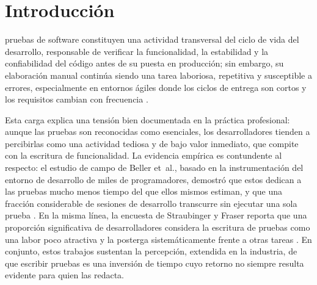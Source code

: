 \documentclass[10pt,journal,twoside,letterpaper]{IEEEtran}
\begin{document}
	\section{Introducción}
	\label{sec:introduccion}
	
	 pruebas de software constituyen una actividad transversal del ciclo de vida del desarrollo, responsable de verificar la funcionalidad, la estabilidad y la confiabilidad del código antes de su puesta en producción; sin embargo, su elaboración manual continúa siendo una tarea laboriosa, repetitiva y susceptible a errores, especialmente en entornos ágiles donde los ciclos de entrega son cortos y los requisitos cambian con frecuencia \cite{lukasczyk2023empirical,wang2024survey}.
	
	Esta carga explica una tensión bien documentada en la práctica profesional: aunque las pruebas son reconocidas como esenciales, los desarrolladores tienden a percibirlas como una actividad tediosa y de bajo valor inmediato, que compite con la escritura de funcionalidad. La evidencia empírica es contundente al respecto: el estudio de campo de Beller et~al., basado en la instrumentación del entorno de desarrollo de miles de programadores, demostró que estos dedican a las pruebas mucho menos tiempo del que ellos mismos estiman, y que una fracción considerable de sesiones de desarrollo transcurre sin ejecutar una sola prueba \cite{beller2015test}. En la misma línea, la encuesta de Straubinger y Fraser reporta que una proporción significativa de desarrolladores considera la escritura de pruebas como una labor poco atractiva y la posterga sistemáticamente frente a otras tareas \cite{straubinger2023survey}. En conjunto, estos trabajos sustentan la percepción, extendida en la industria, de que escribir pruebas es una inversión de tiempo cuyo retorno no siempre resulta evidente para quien las redacta.
	
\end{document}
